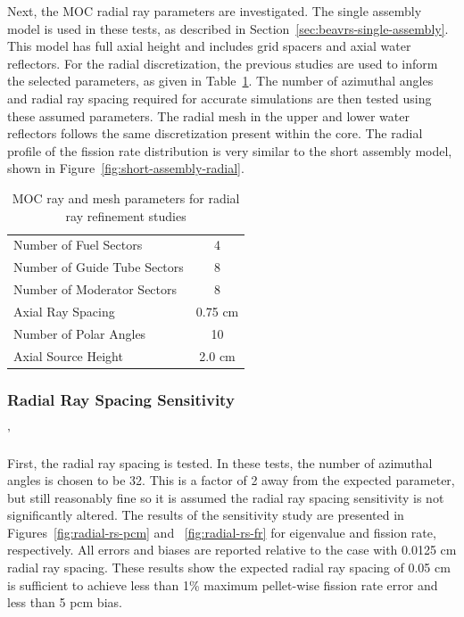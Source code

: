 Next, the \ac{MOC} radial ray parameters are investigated. The single assembly model is used in these tests, as described in Section~\ref{sec:beavrs-single-assembly}. This model has full axial height and includes grid spacers and axial water reflectors. For the radial discretization, the previous studies are used to inform the selected parameters, as given in Table~\ref{tab:rad-ray-ref-params}. The number of azimuthal angles and radial ray spacing required for accurate simulations are then tested using these assumed parameters. The radial mesh in the upper and lower water reflectors follows the same discretization present within the core. The radial profile of the fission rate distribution is very similar to the short assembly model, shown in Figure~\ref{fig:short-assembly-radial}.

\begin{table}[ht]
	\centering
	\caption{MOC ray and mesh parameters for radial ray refinement studies}
	\medskip
	\begin{tabular}{lc}
		\hline
		Number of Fuel Sectors & 4 \\
		Number of Guide Tube Sectors & 8 \\
		Number of Moderator Sectors & 8 \\
		Axial Ray Spacing & 0.75 cm \\
		Number of Polar Angles & 10 \\
		Axial Source Height & 2.0 cm \\
		\hline
	\end{tabular}
	\label{tab:rad-ray-ref-params}
\end{table}

\subsubsection{Radial Ray Spacing Sensitivity}'

First, the radial ray spacing is tested. In these tests, the number of azimuthal angles is chosen to be 32. This is a factor of 2 away from the expected parameter, but still reasonably fine so it is assumed the radial ray spacing sensitivity is not significantly altered. The results of the sensitivity study are presented in Figures~\ref{fig:radial-rs-pcm} and ~\ref{fig:radial-rs-fr} for eigenvalue and fission rate, respectively. All errors and biases are reported relative to the case with 0.0125 cm radial ray spacing. These results show the expected radial ray spacing of 0.05 cm is sufficient to achieve less than 1\% maximum pellet-wise fission rate error and less than 5 pcm bias.

